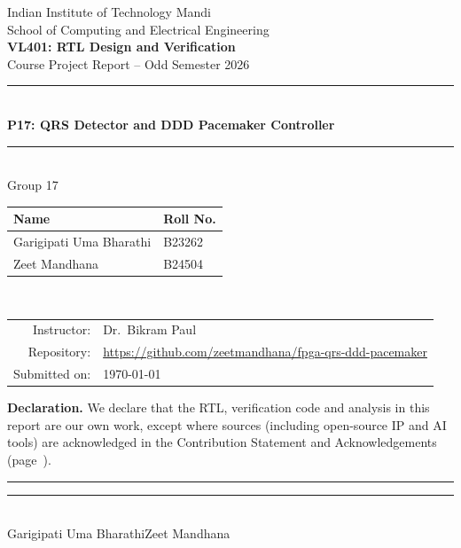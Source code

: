 \documentclass[11pt,a4paper]{article}
\newcommand{\groupno}{17}
\newcommand{\projno}{P17}
\newcommand{\projtitle}{QRS Detector and DDD Pacemaker Controller}
\newcommand{\studentA}{Garigipati Uma Bharathi}
\newcommand{\rollA}{B23262}
\newcommand{\studentB}{Zeet Mandhana}
\newcommand{\rollB}{B24504}
\newcommand{\repourl}{https://github.com/zeetmandhana/fpga-qrs-ddd-pacemaker}
\newcommand{\submitdate}{\today}
\begin{document}
\begin{titlepage}
\centering
{\large Indian Institute of Technology Mandi}\\[2pt]
{\normalsize School of Computing and Electrical Engineering}\\[1.6cm]
{\Large\bfseries VL401: RTL Design and Verification}\\[4pt]
{\large Course Project Report -- Odd Semester 2026}\\[1.6cm]
{\color{iitblue}\rule{\linewidth}{1pt}}\\[8pt]
{\LARGE\bfseries \projno: \projtitle}\\[8pt]
{\color{iitblue}\rule{\linewidth}{1pt}}\\[1.4cm]
{\large Group \groupno}\\[10pt]
\begin{tabular}{ll}
\toprule
\textbf{Name} & \textbf{Roll No.}\\
\midrule
\studentA & \rollA\\
\studentB & \rollB\\
\bottomrule
\end{tabular}\\[1.2cm]
\begin{tabular}{rl}
Instructor: & Dr.\ Bikram Paul\\
Repository: & \url{\repourl}\\
Submitted on: & \submitdate\\
\end{tabular}
\vfill
\begin{minipage}{0.92\linewidth}\small
\textbf{Declaration.} We declare that the RTL, verification code and analysis in this report are our own
work, except where sources (including open-source IP and AI tools) are acknowledged in the
Contribution Statement and Acknowledgements (page~\pageref{sec:contrib}).\\[1.0cm]
\rule{5.5cm}{0.4pt}\hfill\rule{5.5cm}{0.4pt}\\
\studentA\hfill\studentB
\end{minipage}
\end{titlepage}
\end{document}
